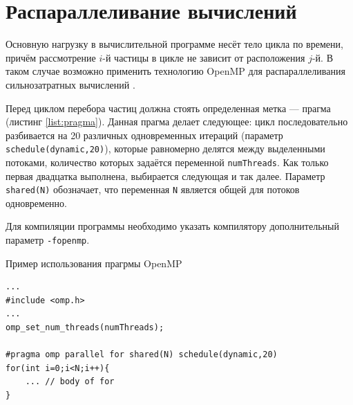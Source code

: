 \section{Распараллеливание вычислений}

Основную нагрузку в вычислительной программе несёт тело цикла по времени, причём  рассмотрение $i$-й частицы в цикле не зависит от расположения $j$-й. В таком случае возможно применить технологию OpenMP для распараллеливания сильнозатратных вычислений \cite{openMPbook}.

Перед циклом перебора частиц должна стоять определенная метка --- прагма (листинг \ref{list:pragma}). Данная прагма делает следующее: цикл последовательно разбивается на 20 различных одновременных итераций (параметр \texttt{schedule(dynamic,20)}), которые равномерно делятся между выделенными потоками, количество которых задаётся переменной \texttt{numThreads}.  Как только первая двадцатка выполнена, выбирается следующая и так далее. Параметр \texttt{shared(N)} обозначает, что переменная \texttt{N} является общей для потоков одновременно.

Для компиляции программы необходимо указать компилятору дополнительный параметр \texttt{-fopenmp}.

\begin{ListingEnv}[h!]
    \caption{Пример использования прагрмы OpenMP}
    \label{list:pragma}
\begin{lstlisting}[language={[ISO]C++}]
...
#include <omp.h>
...
omp_set_num_threads(numThreads);

#pragma omp parallel for shared(N) schedule(dynamic,20) 
for(int i=0;i<N;i++){
	... // body of for
}
\end{lstlisting}
\end{ListingEnv}%
